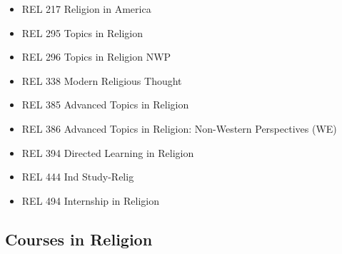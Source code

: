 \documentclass[
  letterpaper,
]{scrbook}
\providecommand{\tightlist}{%
  \setlength{\itemsep}{0pt}\setlength{\parskip}{0pt}}
\begin{document}
\begin{itemize}
  \begin{itemize}
  \tightlist
  \item
    REL 217 Religion in America
  \item
    REL 295 Topics in Religion
  \item
    REL 296 Topics in Religion NWP
  \item
    REL 338 Modern Religious Thought
  \item
    REL 385 Advanced Topics in Religion
  \item
    REL 386 Advanced Topics in Religion: Non-Western Perspectives (WE)
  \item
    REL 394 Directed Learning in Religion
  \item
    REL 444 Ind Study-Relig
  \item
    REL 494 Internship in Religion
  \end{itemize}
\end{itemize}

\subsection{Courses in Religion}\label{courses-in-religion}
\end{document}
